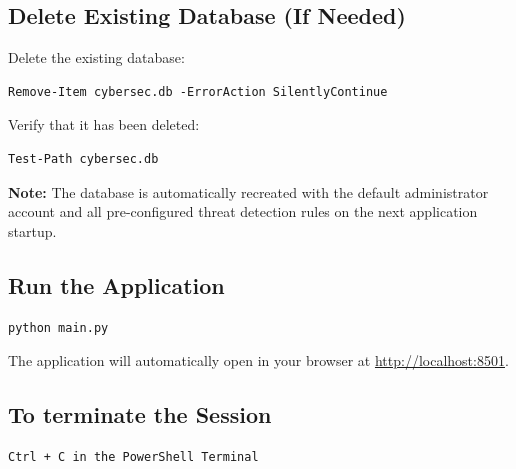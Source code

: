\documentclass[12pt,a4paper]{article}
\begin{document}
\subsection{Delete Existing Database (If Needed)}

\noindent Delete the existing database:

\begin{tcolorbox}[colback=gray!10!white, colframe=gray!70!black, arc=3pt, boxrule=0.5pt]
\begin{verbatim}
Remove-Item cybersec.db -ErrorAction SilentlyContinue
\end{verbatim}
\end{tcolorbox}

\noindent Verify that it has been deleted:

\begin{tcolorbox}[colback=gray!10!white, colframe=gray!70!black, arc=3pt, boxrule=0.5pt]
\begin{verbatim}
Test-Path cybersec.db
\end{verbatim}
\end{tcolorbox}

\begin{tcolorbox}[colback=green!5!white, colframe=green!60!black, arc=3pt, boxrule=0.5pt]
\textbf{Note:} The database is automatically recreated with the default administrator
account and all pre-configured threat detection rules on the next application startup.
\end{tcolorbox}

\subsection{Run the Application}

\begin{tcolorbox}[colback=gray!10!white, colframe=gray!70!black, arc=3pt, boxrule=0.5pt]
\begin{verbatim}
python main.py
\end{verbatim}
\end{tcolorbox}
\noindent The application will automatically open in your browser at
\url{http://localhost:8501}.

\subsection{To terminate the Session}

\begin{tcolorbox}[colback=gray!10!white, colframe=gray!70!black, arc=3pt, boxrule=0.5pt]
\begin{verbatim}
Ctrl + C in the PowerShell Terminal
\end{verbatim}
\end{tcolorbox}
\end{document}
